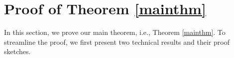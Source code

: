 \documentclass[12pt]{article}
\numberwithin{equation}{section}
\theoremstyle{remark}
\newtheorem{myRem}{Remark}
\newcommand{\1}{{\rm 1}\kern-0.24em{\rm I}}
\begin{document}
%



\section{Proof of Theorem \ref{mainthm}}\label{sec:proof of main}

In this section, we prove our main theorem, i.e.,  Theorem \ref{mainthm}.  To streamline the proof, we first present two technical results and their proof sketches.  
\end{document}

